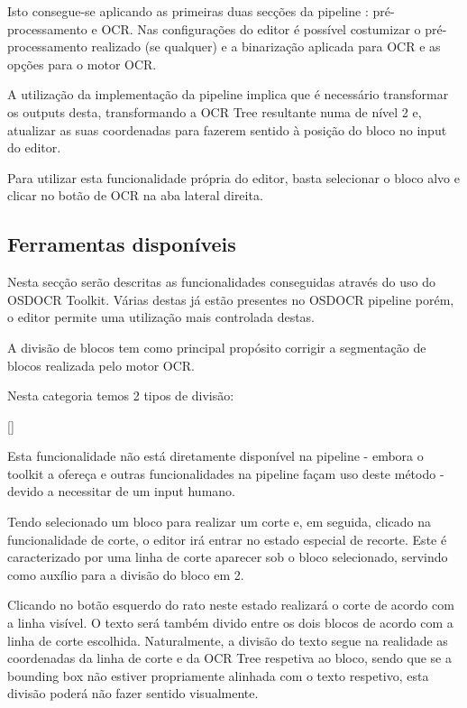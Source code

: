 Isto consegue-se aplicando as primeiras duas secções da pipeline : pré-processamento e OCR. Nas configurações do editor é possível costumizar o pré-processamento realizado (se qualquer) e a binarização aplicada para OCR e as opções para o motor OCR.

A utilização da implementação da pipeline implica que é necessário transformar os outputs desta, transformando a OCR Tree resultante numa de nível 2 e, atualizar as suas coordenadas para fazerem sentido à posição do bloco no input do editor.

Para utilizar esta funcionalidade própria do editor, basta selecionar o bloco alvo e clicar no botão de OCR na aba lateral direita.




\subsection{Ferramentas disponíveis}

Nesta secção serão descritas as funcionalidades conseguidas através do uso do OSDOCR Toolkit. Várias destas já estão presentes no OSDOCR pipeline porém, o editor permite uma utilização mais controlada destas.


A divisão de blocos tem como principal propósito corrigir a segmentação de blocos realizada pelo motor OCR.

Nesta categoria temos 2 tipos de divisão:

[\normalsize]

Esta funcionalidade não está diretamente disponível na pipeline - embora o toolkit a ofereça e outras funcionalidades na pipeline façam uso deste método - devido a necessitar de um input humano.

Tendo selecionado um bloco para realizar um corte e, em seguida, clicado na funcionalidade de corte, o editor irá entrar no estado especial de recorte. Este é caracterizado por uma linha de corte aparecer sob o bloco selecionado, servindo como auxílio para a divisão do bloco em 2.


Clicando no botão esquerdo do rato neste estado realizará o corte de acordo com a linha visível. O texto será também divido entre os dois blocos de acordo com a linha de corte escolhida. Naturalmente, a divisão do texto segue na realidade as coordenadas da linha de corte e da OCR Tree respetiva ao bloco, sendo que se a bounding box não estiver propriamente alinhada com o texto respetivo, esta divisão poderá não fazer sentido visualmente.

